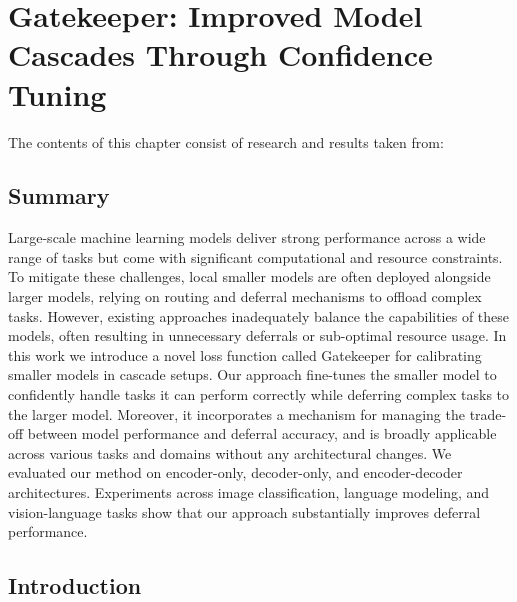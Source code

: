 \newcommand{\bigmodel}{$\mathcal{M}_L$\xspace}
\newcommand{\smallmodel}{$\mathcal{M}_S$\xspace}

\newcommand{\loss}{\emph{Gatekeeper}\xspace}


\chapter{Gatekeeper: Improved Model Cascades Through Confidence Tuning}
\label{ch:gatekeeper}


\begin{paperref}
\normalfont
The contents of this chapter consist of research and results taken from: \emph{}
\end{paperref}

\section*{Summary}

Large-scale machine learning models deliver strong performance across a wide range of tasks but come with significant computational and resource constraints. To mitigate these challenges, local smaller models are often deployed alongside larger models, relying on routing and deferral mechanisms to offload complex tasks. However, existing approaches inadequately balance the capabilities of these models, often resulting in unnecessary deferrals or sub-optimal resource usage. In this work we introduce a novel loss function called Gatekeeper for calibrating smaller models in cascade setups. Our approach fine-tunes the smaller model to confidently handle tasks it can perform correctly while deferring complex tasks to the larger model. Moreover, it incorporates a mechanism for managing the trade-off between model performance and deferral accuracy, and is broadly applicable across various tasks and domains without any architectural changes. We evaluated our method on encoder-only, decoder-only, and encoder-decoder architectures.  Experiments across image classification, language modeling, and vision-language tasks show that our approach substantially improves deferral performance.

\section{Introduction}

